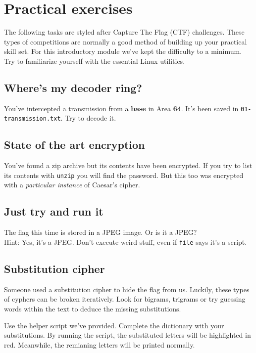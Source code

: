 \newpage

\section{Practical exercises}

The following tasks are styled after Capture The Flag (CTF) challenges. These
types of competitions are normally a good method of building up your practical
skill set. For this introductory module we've kept the difficulty to a minimum.
Try to familiarize yourself with the essential Linux utilities.

\subsection{Where's my decoder ring?}

You've intercepted a transmission from a \textbf{base} in Area \textbf{64}.
It's been saved in \texttt{01-transmission.txt}. Try to decode it.

\subsection{State of the art encryption}

You've found a zip archive but its contents have been encrypted. If you
try to list its contents with \texttt{unzip} you will find the password. But
this too was encrypted with a \textit{particular instance} of Caesar's cipher.

\subsection{Just try and run it}

The flag this time is stored in a JPEG image. Or is it a JPEG? \\
Hint: Yes, it's a JPEG. Don't execute weird stuff, even if \texttt{file} says
      it's a script.

\subsection{Substitution cipher}

Someone used a substitution cipher to hide the flag from us. Luckily, these
types of cyphers can be broken iteratively. Look for bigrams, trigrams or try
guessing words within the text to deduce the missing substitutions.

Use the helper script we've provided. Complete the dictionary with your
substitutions. By running the script, the substituted letters will be
highlighted in red. Meanwhile, the remianing letters will be printed normally.


